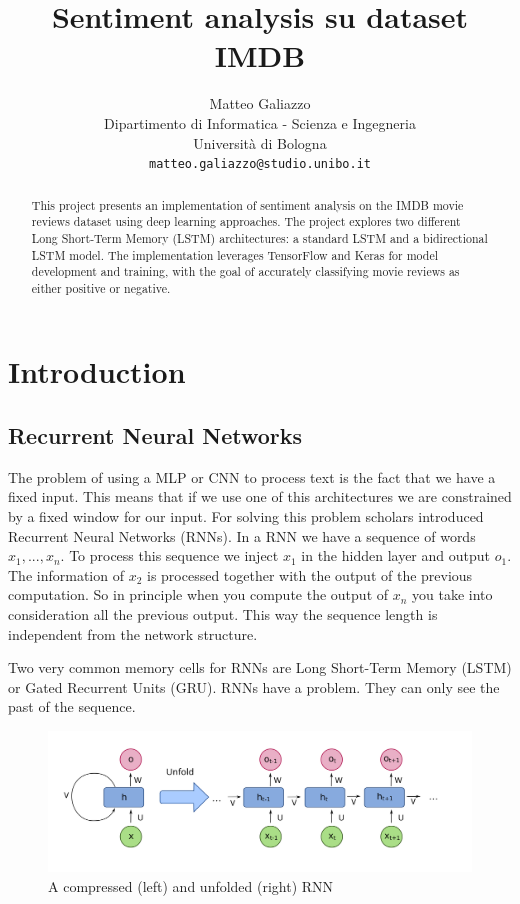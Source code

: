 \documentclass{article}
\title{Sentiment analysis su dataset IMDB}
\author{
 Matteo Galiazzo \\
  Dipartimento di Informatica - Scienza e Ingegneria\\
  Università di Bologna\\
  \texttt{matteo.galiazzo@studio.unibo.it} \\
}
\begin{document}
\maketitle
\begin{abstract}
This project presents an implementation of sentiment analysis on the IMDB movie reviews dataset using deep learning approaches.
The project explores two different Long Short-Term Memory (LSTM) architectures: a standard LSTM and a bidirectional LSTM model.
The implementation leverages TensorFlow and Keras for model development and training, with the goal of accurately classifying movie reviews as either positive or negative.
\end{abstract}


\tableofcontents

\section{Introduction}


\subsection{Recurrent Neural Networks}

The problem of using a MLP or CNN to process text is the fact that we have a fixed input.
This means that if we use one of this architectures we are constrained by a fixed window for our input.
For solving this problem scholars introduced Recurrent Neural Networks (RNNs).
In a RNN we have a sequence of words $x_1, ..., x_n$.
To process this sequence we inject $x_1$ in the hidden layer and output $o_1$.
The information of $x_2$ is processed together with the output of the previous computation.
So in principle when you compute the output of $x_n$ you take into consideration all the previous output.
This way the sequence length is independent from the network structure.

Two very common memory cells for RNNs are Long Short-Term Memory (LSTM) or Gated Recurrent Units (GRU).
RNNs have a problem. They can only see the past of the sequence.

\begin{figure}[htbp]
  \centering
  \includegraphics[width=0.8\linewidth]{img/rnn_unfolded.png}
  \caption{A compressed (left) and unfolded (right) RNN}
  \label{fig:rnn_unfolded}
\end{figure}
\end{document}
